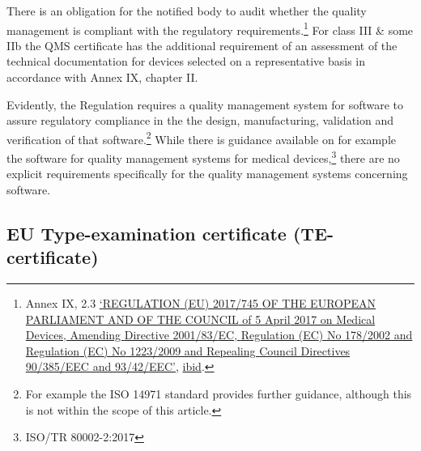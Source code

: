 \documentclass[
]{scrartcl}
\begin{document}
There is an obligation for the notified body to audit whether the quality management is compliant with the regulatory requirements.\footnote{Annex IX, 2.3 \protect\hyperlink{ref-REGULATIONEU2017a}{{`{REGULATION} ({EU}) 2017/745 {OF THE EUROPEAN PARLIAMENT AND OF THE COUNCIL} of 5 {April} 2017 on Medical Devices, Amending {Directive} 2001/83/{EC}, {Regulation} ({EC}) {No} 178/2002 and {Regulation} ({EC}) {No} 1223/2009 and Repealing {Council Directives} 90/385/{EEC} and 93/42/{EEC}'}}, \protect\hyperlink{ref-REGULATIONEU2017a}{ibid}.} For class III \& some IIb the QMS certificate has the additional requirement of an assessment of the technical documentation for devices selected on a representative basis in accordance with Annex IX, chapter II.

Evidently, the Regulation requires a quality management system for software to assure regulatory compliance in the the design, manufacturing, validation and verification of that software.\footnote{For example the ISO 14971 standard provides further guidance, although this is not within the scope of this article.} While there is guidance available on for example the software for quality management systems for medical devices,\footnote{ISO/TR 80002-2:2017} there are no explicit requirements specifically for the quality management systems concerning software.

\hypertarget{subsec:Type-examination}{%
\subsection{EU Type-examination certificate (TE-certificate)}\label{subsec:Type-examination}}
\end{document}

